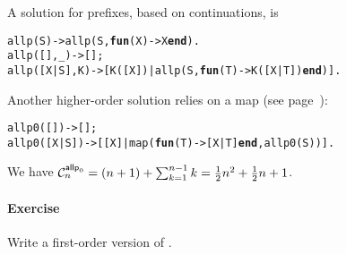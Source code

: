 A solution for prefixes, based on continuations, is
\begin{alltt}
allp(S)       -> allp(S,\textbf{fun}(X) -> X \textbf{end}).
allp(   [],\_) -> [];
allp([X|S],K) -> [K([X])|allp(S,\textbf{fun}(T) -> K([X|T]) \textbf{end})].
\end{alltt}
Another higher\hyp{}order solution  relies on a map
(see page~\pageref{par:maps}):
\begin{alltt}
allp0(   []) -> [];
allp0([X|S]) -> [[X]|map(\textbf{fun}(T) -> [X|T] \textbf{end},allp0(S))].
\end{alltt}
We have \(\C{\fun{allp}_0}{n} = (n+1) + \sum_{k=1}^{n-1}k =
\frac{1}{2}n^2 + \frac{1}{2}n + 1\).

\paragraph{Exercise}

Write a first\hyp{}order version of .
